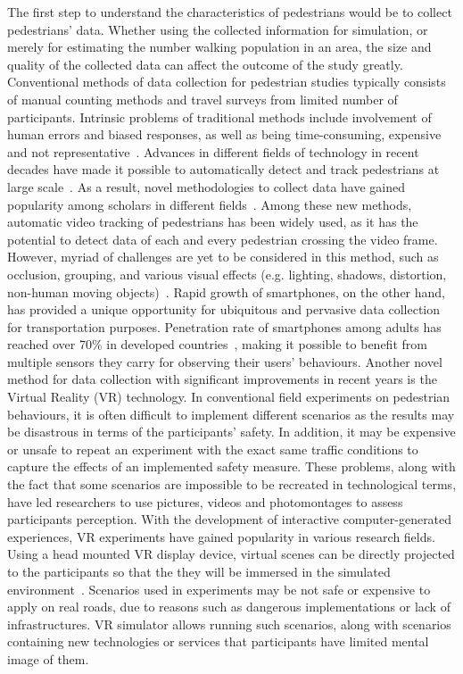 The first step to understand the characteristics of pedestrians would be to collect pedestrians' data. Whether using the collected information for simulation, or merely for estimating the number walking population in an area, the size and quality of the collected data can affect the outcome of the study greatly. Conventional methods of data collection for pedestrian studies typically consists of manual counting methods and travel surveys from limited number of participants. Intrinsic problems of traditional methods include involvement of human errors and biased responses, as well as being time-consuming, expensive and not representative~\cite{shen2014review,dollar2012pedestrian}. Advances in different fields of technology in recent decades have made it possible to automatically detect and track pedestrians at large scale~\cite{bauer2009measurement}. As a result, novel methodologies to collect data have gained popularity among scholars in different fields~\cite{farooq2015ubiquitous}. Among these new methods, automatic video tracking of pedestrians has been widely used, as it has the potential to detect data of each and every pedestrian crossing the video frame. However, myriad of challenges are yet to be considered in this method, such as occlusion, grouping, and  various visual effects (e.g. lighting, shadows, distortion, non-human moving objects)~\cite{ettehadieh2014automated}. 
Rapid growth of smartphones, on the other hand, has provided a unique opportunity for ubiquitous and pervasive data collection for transportation purposes. Penetration rate of smartphones among adults has reached over 70\% in developed countries~\cite{pen}, making it possible to benefit from multiple sensors they carry for observing their users' behaviours. Another novel method for data collection with significant improvements in recent years is the Virtual Reality (VR) technology. In conventional field experiments on pedestrian behaviours, it is often difficult to implement different scenarios as the results may be disastrous in terms of the participants’ safety. In addition, it may be expensive or unsafe to repeat an experiment with the exact same traffic conditions to capture the effects of an implemented safety measure. These problems, along with the fact that some scenarios are impossible to be recreated in technological terms, have led researchers to use pictures, videos and photomontages to assess participants perception. With the development of interactive computer-generated experiences, VR experiments have gained popularity in various research fields. Using a head mounted VR display device, virtual scenes can be directly projected to the participants so that the they will be immersed in the simulated environment~\cite{farooq2018virtual}. Scenarios used in experiments may be not safe or expensive to apply on real roads, due to reasons such as dangerous implementations or lack of infrastructures. VR simulator allows running such scenarios, along with scenarios containing new technologies or services that participants have limited mental image of them. 

